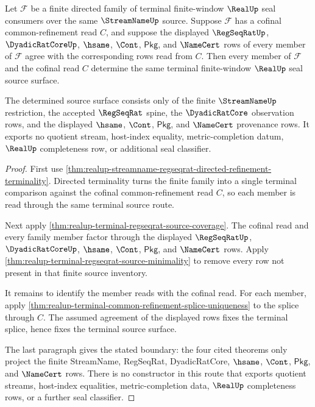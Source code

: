 \begin{theorem}
\label{thm:realup-finite-window-seal-cofinality}
Let $\mathcal{F}$ be a finite directed family of terminal finite-window
$\RealUp$ seal consumers over the same $\StreamNameUp$ source. Suppose
$\mathcal{F}$ has a cofinal common-refinement read $C$, and suppose the displayed
$\RegSeqRatUp$, $\DyadicRatCoreUp$, $\hsame$, $\Cont$, $\mathsf{Pkg}$, and
$\NameCert$ rows of every member of $\mathcal{F}$ agree with the corresponding
rows read from $C$. Then every member of $\mathcal{F}$ and the cofinal read $C$
determine the same terminal finite-window $\RealUp$ seal source surface.

The determined source surface consists only of the finite $\StreamNameUp$
restriction, the accepted $\RegSeqRat$ spine, the $\DyadicRatCore$ observation
rows, and the displayed $\hsame$, $\Cont$, $\mathsf{Pkg}$, and $\NameCert$
provenance rows. It exports no quotient stream, host-index equality,
metric-completion datum, $\RealUp$ completeness row, or additional seal
classifier.
\end{theorem}
\begin{proof}
First use
\autoref{thm:realup-streamname-regseqrat-directed-refinement-terminality}.
Directed terminality
turns the finite family into a single terminal comparison against the cofinal
common-refinement read $C$, so each member is read through the same terminal
source route.

Next apply \autoref{thm:realup-terminal-regseqrat-source-coverage}. The cofinal
read and every family member factor through the displayed $\RegSeqRatUp$,
$\DyadicRatCoreUp$, $\hsame$, $\Cont$, $\mathsf{Pkg}$, and $\NameCert$ rows.
Apply \autoref{thm:realup-terminal-regseqrat-source-minimality} to remove every
row not present in that finite source inventory.

It remains to identify the member reads with the cofinal read. For each member,
apply \autoref{thm:realup-terminal-common-refinement-splice-uniqueness} to the
splice through $C$. The assumed agreement of the displayed rows fixes the
terminal splice, hence fixes the terminal source surface.

The last paragraph gives the stated boundary: the four cited theorems only
project the finite StreamName, RegSeqRat, DyadicRatCore, $\hsame$, $\Cont$,
$\mathsf{Pkg}$, and $\NameCert$ rows. There is no constructor in this route that
exports quotient streams, host-index equalities, metric-completion data,
$\RealUp$ completeness rows, or a further seal classifier.
\end{proof}

